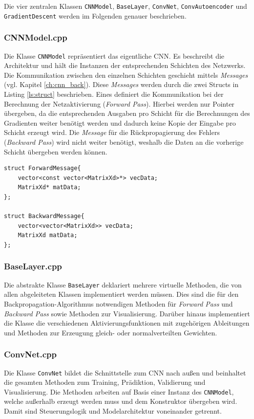Die vier zentralen Klassen \texttt{CNNModel}, \texttt{BaseLayer}, \texttt{ConvNet}, \texttt{ConvAutoencoder} und \texttt{Gradient\-Descent} werden im Folgenden genauer beschrieben. 

\subsubsection{CNNModel.cpp}
Die Klasse \texttt{CNNModel} repräsentiert das eigentliche CNN. Es beschreibt die Architektur und hält die Instanzen der entsprechenden Schichten des Netzwerks. 
Die Kommunikation zwischen den einzelnen Schichten geschieht mittels \textit{Messages} (vgl. Kapitel \ref{ch:cnn_back}). Diese \textit{Messages} werden durch die zwei Structs in Listing \ref{ls:struct} beschrieben. Eines definiert die Kommunikation bei der Berechnung der Netzaktivierung (\textit{Forward Pass}). Hierbei werden nur Pointer übergeben, da die entsprechenden Ausgaben pro Schicht für die Berechnungen des Gradienten weiter benötigt werden und dadurch keine Kopie der Eingabe pro Schicht erzeugt wird. Die \textit{Message} für die Rückpropagierung des Fehlers (\textit{Backward Pass}) wird nicht weiter benötigt, weshalb die Daten an die vorherige Schicht übergeben werden können.


\begin{lstlisting}[label=ls:struct,caption=Definitionen der Structs für die Kommunikation zwischen den einzelnen Schichten des CNN,captionpos=b]
struct ForwardMessage{
	vector<const vector<MatrixXd>*> vecData;
	MatrixXd* matData;
};

struct BackwardMessage{
	vector<vector<MatrixXd>> vecData;
	MatrixXd matData;
};
\end{lstlisting}

\subsubsection{BaseLayer.cpp}
Die abstrakte Klasse \texttt{BaseLayer} deklariert mehrere virtuelle Methoden, die von allen abgeleiteten Klassen implementiert werden müssen. Dies sind die für den Backpropagation-Algorithmus notwendigen Methoden für \textit{Forward Pass} und \textit{Backward Pass} sowie Methoden zur Visualisierung.
Darüber hinaus implementiert die Klasse die verschiedenen Aktivierungsfunktionen mit zugehörigen Ableitungen und Methoden zur Erzeugung gleich- oder normalverteilten Gewichten.


\subsubsection{ConvNet.cpp}
Die Klasse \texttt{ConvNet} bildet die Schnittstelle zum CNN nach außen und beinhaltet die gesamten Methoden zum Training, Prädiktion, Validierung und Visualisierung.
Die Methoden arbeiten auf Basis einer Instanz des \texttt{CNNModel}, welche außerhalb erzeugt werden muss und dem Konstruktor übergeben wird. 
Damit sind Steuerungslogik und Modelarchitektur voneinander getrennt.

